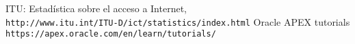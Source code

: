 \clearpage
{}
\begin{thebibliography}{15}
	ITU: Estadística sobre el acceso a Internet,
	\\\texttt{http://www.itu.int/ITU-D/ict/statistics/index.html}
  Oracle APEX tutorials
	\\\texttt{https://apex.oracle.com/en/learn/tutorials/}
\end{thebibliography}